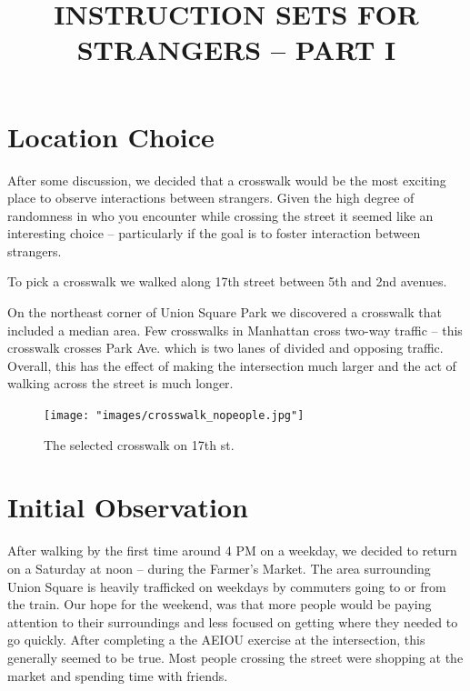 \documentclass[11pt]{report}
\title{INSTRUCTION SETS FOR STRANGERS -- PART I}
\date{}
\begin{document}
\maketitle
\section*{Location Choice}

After some discussion, we decided that a crosswalk would be the most exciting place to observe interactions between strangers. Given the high degree of randomness in who you encounter while crossing the street it seemed like an interesting choice -- particularly if the goal is to foster interaction between strangers. 

To pick a crosswalk we walked along 17th street between 5th and 2nd avenues. 

On the northeast corner of Union Square Park we discovered a crosswalk that included a median area. Few crosswalks in Manhattan cross two-way traffic -- this crosswalk crosses Park Ave. which is two lanes of divided and opposing traffic. Overall, this has the effect of making the intersection much larger and the act of walking across the street is much longer. 

\begin{figure}[ht]
\centering
\texttt{[image: "images/crosswalk\_nopeople.jpg"]}
\caption{The selected crosswalk on 17th st.}
\label{fig:nopeople}
\end{figure}


\section*{Initial Observation}

After walking by the first time around 4 PM on a weekday, we decided to return on a Saturday at noon -- during the Farmer's Market. The area surrounding Union Square is heavily trafficked on weekdays by commuters going to or from the train. Our hope for the weekend, was that more people would be paying attention to their surroundings and less focused on getting where they needed to go quickly. After completing a the AEIOU exercise at the intersection, this generally seemed to be true. Most people crossing the street were shopping at the market and spending time with friends. 
\end{document}
